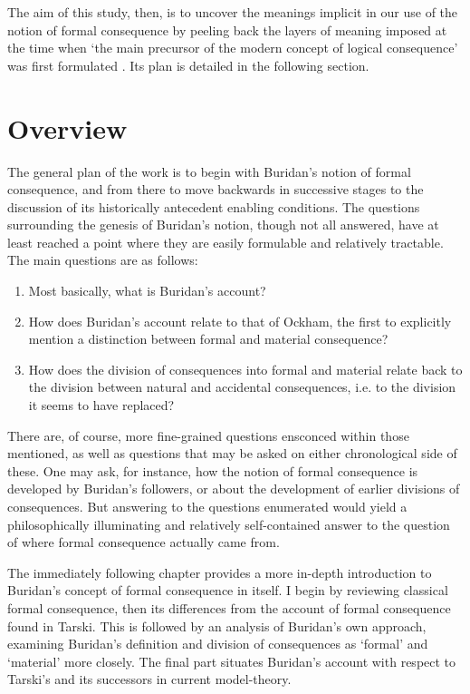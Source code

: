 \documentclass[]{article}
\begin{document}
The aim of this study, then, is to uncover the meanings implicit in our use of the notion of formal consequence by peeling back the layers of meaning imposed at the time when `the main precursor of the modern concept of logical consequence' was first formulated \cite{DutilhNovaes2012a}. Its plan is detailed in the following section.

\section{Overview}
The general plan of the work is to begin with Buridan's notion of formal consequence, and from there to move backwards in successive stages to the discussion of its historically antecedent enabling conditions. The questions surrounding the genesis of Buridan's notion, though not all answered, have at least reached a point where they are easily formulable and relatively tractable. The main questions are as follows: 
\begin{enumerate}
\item Most basically, what is Buridan's account?
\item How does Buridan's account relate to that of Ockham, the first to explicitly mention a distinction between formal and material consequence?
\item How does the division of consequences into formal and material relate back to the division between natural and accidental consequences, i.e. to the division it seems to have replaced?
\end{enumerate}
There are, of course, more fine-grained questions ensconced within those mentioned, as well as questions that may be asked on either chronological side of these. One may ask, for instance, how the notion of formal consequence is developed by Buridan's followers, or about the development of earlier divisions of consequences. But answering to the questions enumerated would yield a philosophically illuminating and relatively self-contained answer to the question of where formal consequence actually came from.

The immediately following chapter provides a more in-depth introduction to Buridan's concept of formal consequence in itself. I begin by reviewing classical formal consequence, then its differences from the account of formal consequence found in Tarski. This is followed by an analysis of Buridan's own approach, examining Buridan's definition and division of consequences as `formal' and `material' more closely. The final part situates Buridan's account with respect to Tarski's and its successors in current model-theory. 
\end{document}
